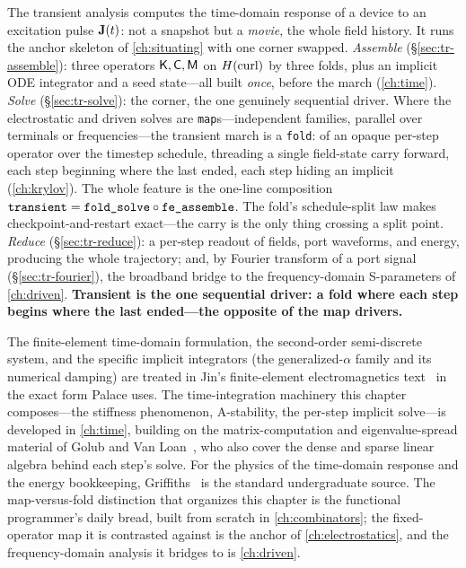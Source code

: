 \summarysection
The transient analysis computes the time-domain response of a device to an
excitation pulse $\mathbf{J}(t)$: not a snapshot but a \emph{movie}, the whole field
history. It runs the anchor skeleton of \cref{ch:situating} with one corner swapped.
\emph{Assemble} (\S\ref{sec:tr-assemble}): three operators $\mathsf{K},\mathsf{C},\mathsf{M}$ on
$H(\mathrm{curl})$ by three  folds, plus an implicit ODE integrator and a
seed state---all built \emph{once}, before the march (\cref{ch:time}). \emph{Solve}
(\S\ref{sec:tr-solve}): the  corner, the one genuinely sequential
driver. Where the electrostatic and driven solves are \texttt{map}s---independent
families, parallel over terminals or frequencies---the transient march is a
\texttt{fold}:  of an opaque per-step operator over the timestep
schedule, threading a single field-state carry forward, each step beginning where the
last ended, each step hiding an implicit  (\cref{ch:krylov}). The
whole feature is the one-line composition
$\texttt{transient}=\texttt{fold\_solve}\circ\texttt{fe\_assemble}$. The fold's
schedule-split law makes checkpoint-and-restart exact---the carry is the only thing
crossing a split point. \emph{Reduce} (\S\ref{sec:tr-reduce}): a per-step readout of
fields, port waveforms, and energy, producing the whole trajectory; and, by Fourier
transform of a port signal (\S\ref{sec:tr-fourier}), the broadband bridge to the
frequency-domain S-parameters of \cref{ch:driven}. \textbf{Transient is the one
sequential driver: a fold where each step begins where the last ended---the opposite
of the map drivers.}

\furtherreading
The finite-element time-domain formulation, the second-order semi-discrete system,
and the specific implicit integrators (the generalized-$\alpha$ family and its
numerical damping) are treated in Jin's finite-element electromagnetics
text~\citep{jin2014} in the exact form Palace uses. The time-integration machinery
this chapter composes---the stiffness phenomenon, A-stability, the per-step implicit
solve---is developed in \cref{ch:time}, building on the matrix-computation and
eigenvalue-spread material of Golub and Van Loan~\citep{golubvanloan2013}, who also
cover the dense and sparse linear algebra behind each step's solve. For the physics
of the time-domain response and the energy bookkeeping, Griffiths~\citep{griffiths2017}
is the standard undergraduate source. The map-versus-fold distinction that organizes
this chapter is the functional programmer's daily bread, built from scratch in
\cref{ch:combinators}; the fixed-operator map it is contrasted against is the anchor
of \cref{ch:electrostatics}, and the frequency-domain analysis it bridges to is
\cref{ch:driven}.

